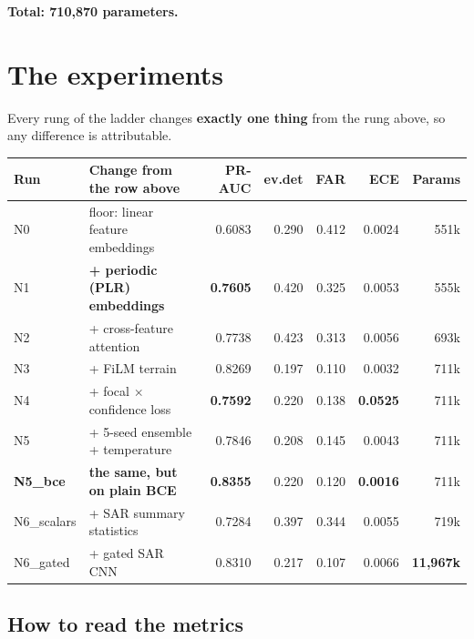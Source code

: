 \documentclass[11pt,a4paper]{article}
\newcommand{\good}[1]{\textcolor{green!45!black}{\textbf{#1}}}
\newcommand{\bad}[1]{\textcolor{red!65!black}{\textbf{#1}}}
\begin{document}
\textbf{Total: 710,870 parameters.}

\section{The experiments}

Every rung of the ladder changes \textbf{exactly one thing} from the rung above,
so any difference is attributable.

\begin{table}[h]
\centering
\small
\begin{tabular}{@{}llrrrrr@{}}
\toprule
\textbf{Run} & \textbf{Change from the row above} & \textbf{PR-AUC} & \textbf{ev.det} & \textbf{FAR} & \textbf{ECE} & \textbf{Params} \\
\midrule
N0 & floor: linear feature embeddings & 0.6083 & 0.290 & 0.412 & 0.0024 & 551k \\
N1 & \textbf{+ periodic (PLR) embeddings} & \good{0.7605} & 0.420 & 0.325 & 0.0053 & 555k \\
N2 & + cross-feature attention & 0.7738 & 0.423 & 0.313 & 0.0056 & 693k \\
N3 & + FiLM terrain & 0.8269 & 0.197 & 0.110 & 0.0032 & 711k \\
N4 & + focal $\times$ confidence loss & \bad{0.7592} & 0.220 & 0.138 & \bad{0.0525} & 711k \\
N5 & + 5-seed ensemble + temperature & 0.7846 & 0.208 & 0.145 & 0.0043 & 711k \\
\textbf{N5\_bce} & \textbf{the same, but on plain BCE} & \good{0.8355} & 0.220 & 0.120 & \good{0.0016} & 711k \\
N6\_scalars & + SAR summary statistics & 0.7284 & 0.397 & 0.344 & 0.0055 & 719k \\
N6\_gated & + gated SAR CNN & 0.8310 & 0.217 & 0.107 & 0.0066 & \bad{11,967k} \\
\bottomrule
\end{tabular}
\end{table}

\subsection{How to read the metrics}
\end{document}
